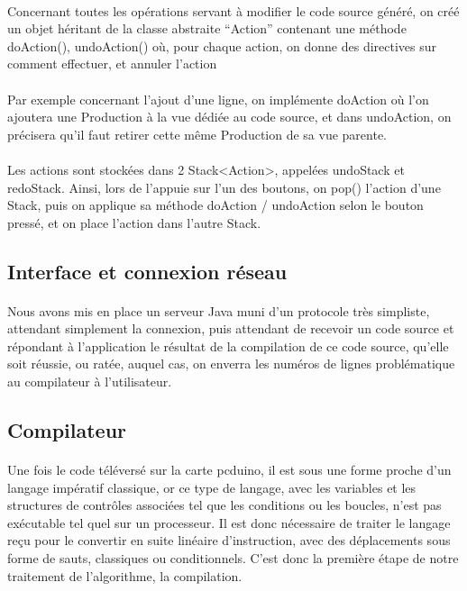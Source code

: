 \documentclass[a4paper]{article}
\begin{document}
\paragraph{}
Concernant toutes les opérations servant à modifier le code source généré, on créé un objet héritant de la classe abstraite “Action” contenant une méthode doAction(), undoAction() où, pour chaque action, on donne des directives sur comment effectuer, et annuler l’action

\paragraph{}
Par exemple concernant l’ajout d’une ligne, on implémente doAction où l’on ajoutera une Production à la vue dédiée au code source, et dans undoAction, on précisera qu’il faut retirer cette même Production de sa vue parente.

\paragraph{}
Les actions sont stockées dans 2 Stack<Action>, appelées undoStack et redoStack.
Ainsi, lors de l’appuie sur l’un des boutons, on pop() l’action d’une Stack, puis on applique sa méthode doAction / undoAction selon le bouton pressé, et on place l’action dans l’autre Stack.

\subsection{Interface et connexion réseau}

\paragraph{}
Nous avons mis en place un serveur Java muni d’un protocole très simpliste, attendant simplement la connexion, puis attendant de recevoir un code source et répondant à l’application le résultat de la compilation de ce code source, qu’elle soit réussie, ou ratée, auquel cas, on enverra les numéros de lignes problématique au compilateur à l’utilisateur. 

\subsection{Compilateur}
\paragraph{}
Une fois le code téléversé sur la carte pcduino, il est sous une forme proche d’un langage impératif classique, or ce type de langage, avec les variables et les structures de contrôles associées tel que les conditions ou les boucles, n’est pas exécutable tel quel sur un processeur. Il est donc nécessaire de traiter le langage reçu pour le convertir en suite linéaire d’instruction, avec des déplacements sous forme de sauts, classiques ou conditionnels. C’est donc la première étape de notre traitement de l’algorithme, la compilation.
\end{document}
